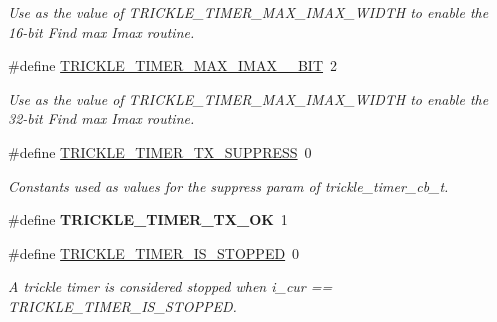 \begin{DoxyCompactItemize}
\begin{DoxyCompactList}\small\item\em Use as the value of T\+R\+I\+C\+K\+L\+E\+\_\+\+T\+I\+M\+E\+R\+\_\+\+M\+A\+X\+\_\+\+I\+M\+A\+X\+\_\+\+W\+I\+D\+T\+H to enable the 16-\/bit \textquotesingle{}Find max Imax\textquotesingle{} routine. \end{DoxyCompactList}\item 
\hypertarget{group__trickle-timer_gaaaa2a3bec490540d904a0b4a44c6251d}{}\#define \hyperlink{group__trickle-timer_gaaaa2a3bec490540d904a0b4a44c6251d}{T\+R\+I\+C\+K\+L\+E\+\_\+\+T\+I\+M\+E\+R\+\_\+\+M\+A\+X\+\_\+\+I\+M\+A\+X\+\_\+\_\+\+B\+I\+T}~2\label{group__trickle-timer_gaaaa2a3bec490540d904a0b4a44c6251d}

\begin{DoxyCompactList}\small\item\em Use as the value of T\+R\+I\+C\+K\+L\+E\+\_\+\+T\+I\+M\+E\+R\+\_\+\+M\+A\+X\+\_\+\+I\+M\+A\+X\+\_\+\+W\+I\+D\+T\+H to enable the 32-\/bit \textquotesingle{}Find max Imax\textquotesingle{} routine. \end{DoxyCompactList}\item 
\hypertarget{group__trickle-timer_ga45ed26596d700d8c9111751b243eae7b}{}\#define \hyperlink{group__trickle-timer_ga45ed26596d700d8c9111751b243eae7b}{T\+R\+I\+C\+K\+L\+E\+\_\+\+T\+I\+M\+E\+R\+\_\+\+T\+X\+\_\+\+S\+U\+P\+P\+R\+E\+S\+S}~0\label{group__trickle-timer_ga45ed26596d700d8c9111751b243eae7b}

\begin{DoxyCompactList}\small\item\em Constants used as values for the {\itshape suppress} param of trickle\+\_\+timer\+\_\+cb\+\_\+t. \end{DoxyCompactList}\item 
\hypertarget{group__trickle-timer_gae692f25bfc1a2915a28389db0fb2a752}{}\#define {\bfseries T\+R\+I\+C\+K\+L\+E\+\_\+\+T\+I\+M\+E\+R\+\_\+\+T\+X\+\_\+\+O\+K}~1\label{group__trickle-timer_gae692f25bfc1a2915a28389db0fb2a752}

\item 
\#define \hyperlink{group__trickle-timer_ga46a9d1ac6e07dc96cfd6224b873333ca}{T\+R\+I\+C\+K\+L\+E\+\_\+\+T\+I\+M\+E\+R\+\_\+\+I\+S\+\_\+\+S\+T\+O\+P\+P\+E\+D}~0
\begin{DoxyCompactList}\small\item\em A trickle timer is considered \textquotesingle{}stopped\textquotesingle{} when i\+\_\+cur == T\+R\+I\+C\+K\+L\+E\+\_\+\+T\+I\+M\+E\+R\+\_\+\+I\+S\+\_\+\+S\+T\+O\+P\+P\+E\+D. \end{DoxyCompactList}\end{DoxyCompactItemize}
